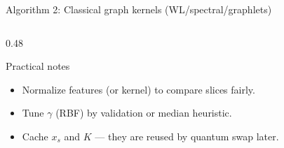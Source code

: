 \documentclass[aspectratio=169,xcolor={dvipsnames}]{beamer}
\begin{document}
\begin{frame}[fragile, shrink=30]{Algorithm 2: Classical graph kernels (WL/spectral/graphlets)}
\begin{columns}[T,onlytextwidth]
\begin{column}{0.48\textwidth}
    \vspace{1mm}
    \begin{block}{Practical notes}
    \footnotesize
    \begin{itemize}\setlength\itemsep{2pt}
    \item Normalize features (or kernel) to compare slices fairly.
    \item Tune $\gamma$ (RBF) by validation or median heuristic.
    \item Cache $x_s$ and $K$ --- they are reused by quantum swap later.
    \end{itemize}
    \end{block}
    \end{column}
    \end{columns}
    \end{frame}
\end{document}
